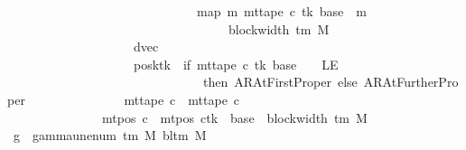 \begin{isabellebody}
\ \ \ \ \ \ \ \ \ \ \ \ \ \ \ \ \ \ \ \ \ \ \ \ \ \ \ \ \ \ {\isacharparenleft}{\kern0pt}map\ {\isacharparenleft}{\kern0pt}{\isasymlambda}m{\isachardot}{\kern0pt}\ mt{\isacharunderscore}{\kern0pt}tape\ c{\isacharprime}{\kern0pt}\ tk\ {\isacharparenleft}{\kern0pt}base\ {\isacharplus}{\kern0pt}\ m{\isacharparenright}{\kern0pt}{\isacharparenright}{\kern0pt}\isanewline
\ \ \ \ \ \ \ \ \ \ \ \ \ \ \ \ \ \ \ \ \ \ \ \ \ \ \ \ \ \ \ \ \ \ \ {\isacharbrackleft}{\kern0pt}{}{\isachardot}{\kern0pt}{\isachardot}{\kern0pt}{\isacharless}{\kern0pt}block{\isacharunderscore}{\kern0pt}width\ {\isacharparenleft}{\kern0pt}{\isasymGamma}{\isacharunderscore}{\kern0pt}tm\ M{\isacharparenright}{\kern0pt}{\isacharbrackright}{\kern0pt}{\isacharparenright}{\kern0pt}{\isacharparenright}{\kern0pt}{\isacharcomma}{\kern0pt}\isanewline
\ \ \ \ \ \ \ \ \ \ \ \ \ \ \ \ \ \ \ \ dvec{\isacharcomma}{\kern0pt}\isanewline
\ \ \ \ \ \ \ \ \ \ \ \ \ \ \ \ \ \ \ \ posk{\isacharparenleft}{\kern0pt}tk\ {\isacharcolon}{\kern0pt}{\isacharequal}{\kern0pt}\ if\ mt{\isacharunderscore}{\kern0pt}tape\ c{\isacharprime}{\kern0pt}\ tk\ {\isacharparenleft}{\kern0pt}base\ {\isacharminus}{\kern0pt}\ {}{\isacharparenright}{\kern0pt}\ {\isacharequal}{\kern0pt}\ LE{}\isanewline
\ \ \ \ \ \ \ \ \ \ \ \ \ \ \ \ \ \ \ \ \ \ \ \ \ \ \ \ \ \ \ then\ AR{\isacharunderscore}{\kern0pt}AtFirstProper\ else\ AR{\isacharunderscore}{\kern0pt}AtFurtherProper{\isacharparenright}{\kern0pt}{\isacharparenright}{\kern0pt}\isanewline
\ \ \ \ \ \ \ \ \ \ \ \ \ \ {\isasymand}\ mt{\isacharunderscore}{\kern0pt}tape\ c{\isacharprime}{\kern0pt}{\isacharprime}{\kern0pt}\ {\isacharequal}{\kern0pt}\ mt{\isacharunderscore}{\kern0pt}tape\ c{\isacharprime}{\kern0pt}\isanewline
\ \ \ \ \ \ \ \ \ \ \ \ \ \ {\isasymand}\ mt{\isacharunderscore}{\kern0pt}pos\ c{\isacharprime}{\kern0pt}{\isacharprime}{\kern0pt}\ {\isacharequal}{\kern0pt}\ {\isacharparenleft}{\kern0pt}mt{\isacharunderscore}{\kern0pt}pos\ c{\isacharprime}{\kern0pt}{\isacharparenright}{\kern0pt}{\isacharparenleft}{\kern0pt}tk\ {\isacharcolon}{\kern0pt}{\isacharequal}{\kern0pt}\ base\ {\isacharplus}{\kern0pt}\ block{\isacharunderscore}{\kern0pt}width\ {\isacharparenleft}{\kern0pt}{\isasymGamma}{\isacharunderscore}{\kern0pt}tm\ M{\isacharparenright}{\kern0pt}{\isacharparenright}{\kern0pt}{\isachardoublequoteclose}\isanewline
%
\isadelimproof
%
\endisadelimproof
%
\isatagproof
{}\isamarkupfalse%
\ {\isacharminus}{\kern0pt}\isanewline
\ \ \isamarkupfalse%
\ {\isacharquery}{\kern0pt}g{}\ {\isacharequal}{\kern0pt}\ {\isachardoublequoteopen}gamma{\isacharunderscore}{\kern0pt}unenum\ {\isacharparenleft}{\kern0pt}{\isasymGamma}{\isacharunderscore}{\kern0pt}tm\ M{\isacharparenright}{\kern0pt}\ {\isacharparenleft}{\kern0pt}bl{\isacharunderscore}{\kern0pt}tm\ M{\isacharparenright}{\kern0pt}\ {}{\isachardoublequoteclose}\isanewline

\end{isabellebody}
